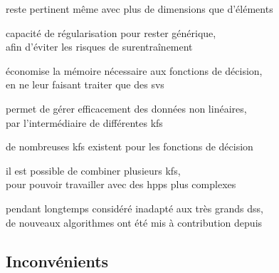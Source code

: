 \begin{itmz}
\item{reste pertinent même avec plus de dimensions que d’éléments}

\end{itmz}\begin{itmz}

\item{capacité de régularisation pour rester générique,\\
afin d’éviter les risques de surentraînement}

\end{itmz}\begin{itmz}

\item{économise la mémoire nécessaire aux fonctions de décision,\\
en ne leur faisant traiter que des \glspl{sv}}

\end{itmz}\begin{itmz}

\item{permet de gérer efficacement des données non linéaires,\\
par l’intermédiaire de différentes \glspl{kf}}

\end{itmz}\begin{itmz}

\item{de nombreuses \glspl{kf} existent pour les fonctions de décision}

\end{itmz}\begin{itmz}

\item{il est possible de combiner plusieurs \glspl{kf},\\
pour pouvoir travailler avec des \glspl{hpp} plus complexes}

\end{itmz}\begin{itmz}

\item{pendant longtemps considéré inadapté aux très grands \glspl{ds},\\
de nouveaux algorithmes ont été mis à contribution depuis \cite{large-scale}}

\end{itmz}


\subsection{Inconvénients}


